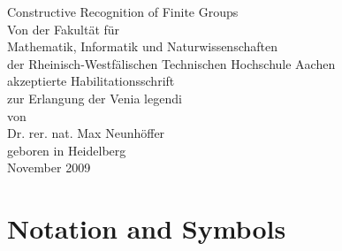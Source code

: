 \documentclass[openany,11pt,british]{book}
\theoremstyle{changebreak}
\begin{document}
\thispagestyle{empty}
\begin{center}
    {\Huge Constructive Recognition of Finite Groups}\\[3cm]
\large
Von der Fakult\"at f\"ur\\[5mm]
Mathematik, Informatik und Naturwissenschaften\\[5mm]
der Rheinisch-Westf\"alischen Technischen Hochschule Aachen\\[5mm]
akzeptierte Habilitationsschrift\\[5mm]
zur Erlangung der Venia legendi\\[4cm]
von\\[5mm]
Dr. rer. nat. Max Neunh\"offer\\[5mm]
geboren in Heidelberg\\[4cm]
November 2009
\end{center}
\newpage




\newpage\enlargethispage{-2\baselineskip}
\tableofcontents
\thispagestyle{fancy}





%




%

\appendix

%

\thispagestyle{fancy}

\chapter{Notation and Symbols}
\end{document}
